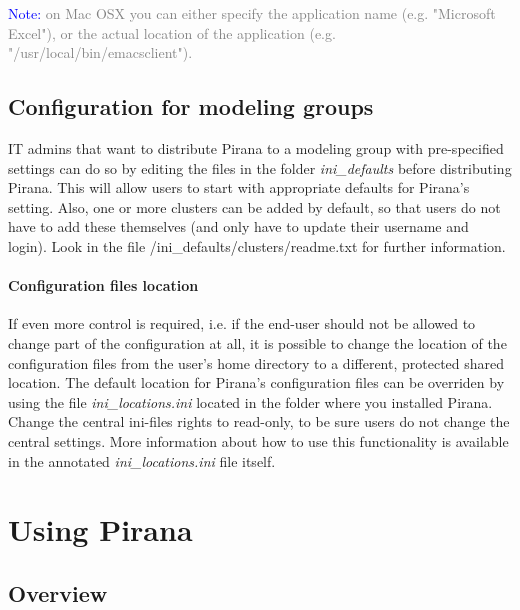 \vspace{10pt}
\noindent\scriptsize{\textcolor{Blue}{Note:} \textcolor{Grey} {on Mac OSX you can either specify the application name
(e.g. "Microsoft Excel"), or the actual location of the application
(e.g. "/usr/local/bin/emacsclient").}
\normalsize

\newpage

\section{Configuration for modeling groups}
IT admins that want to distribute Pirana to a modeling group with
pre-specified settings can do so by editing the files in the folder \textit{ini\_defaults}
before distributing Pirana. This will allow users to start with appropriate defaults for Pirana's setting. Also, one
or more clusters can be added by default, so that users do not have to
add these themselves (and only have to update their username and login). Look in
the file /ini\_defaults/clusters/readme.txt for further
information.

\subsubsection{Configuration files location}
If even more control is required, i.e. if the end-user should not be
allowed to change part of the configuration at all, it is possible to
change the location of the configuration files from the user's home
directory to a different, protected shared location. The default location for
Pirana's configuration files can be overriden by using the file
\textit{ini\_locations.ini} located in the folder where you installed
Pirana. Change the central ini-files rights to read-only, to be sure users do
not change the central settings. More information about how to use
this functionality is available in the annotated \textit{ini\_locations.ini}
file itself.

\newpage  %
\thispagestyle{empty}
\mbox{}

\chapter{Using Pirana}

\section{Overview}

}
